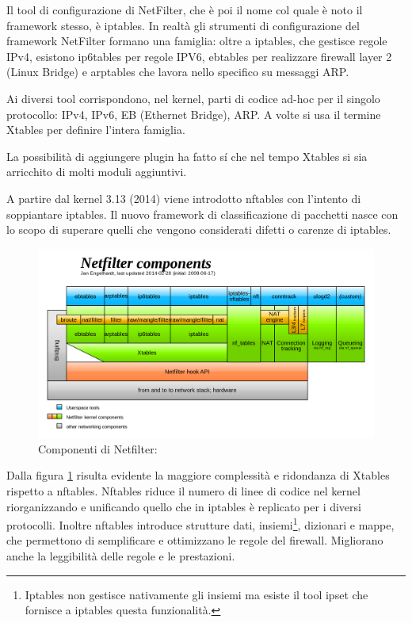 Il tool di configurazione di NetFilter, che è poi il nome col quale è noto il
framework stesso, è iptables.
In realtà gli strumenti di configurazione del framework NetFilter formano una
famiglia: oltre a iptables, che gestisce regole IPv4, esistono ip6tables per
regole IPV6, ebtables per realizzare firewall layer 2 (Linux Bridge)
e arptables che lavora nello specifico su messaggi ARP.

Ai diversi tool corrispondono, nel kernel, parti di codice ad-hoc per il
singolo protocollo: IPv4, IPv6, EB (Ethernet Bridge), ARP.  A volte si usa
il termine Xtables per definire l'intera famiglia.

La possibilità di aggiungere plugin ha fatto s\'i che nel tempo Xtables si
sia arricchito di molti moduli aggiuntivi.

A partire dal kernel 3.13 (2014) viene introdotto nftables con l'intento
di soppiantare iptables.  Il nuovo framework di classificazione di pacchetti
nasce con lo scopo di superare quelli che vengono considerati difetti o
carenze di iptables.
\begin{figure}[H]
    \includegraphics[width=\linewidth]{Netfilter-components.svg.png}
    \caption[Componenti di Netfilter]{Componenti di Netfilter:\footnotemark}
    \label{fig:netfilter}
\end{figure}
\noindent Dalla figura \ref{fig:netfilter} risulta evidente la maggiore complessità e
%
ridondanza di Xtables rispetto a nftables.  Nftables riduce il numero di linee
di codice nel kernel riorganizzando e unificando quello che in iptables è
replicato per i diversi protocolli.  Inoltre nftables introduce strutture
dati, insiemi\footnote{Iptables non gestisce nativamente gli insiemi ma esiste
il tool ipset che fornisce a iptables questa funzionalità.}, dizionari e mappe,
che permettono di semplificare e ottimizzano le regole del firewall.
Migliorano anche la leggibilità delle regole e le prestazioni.

